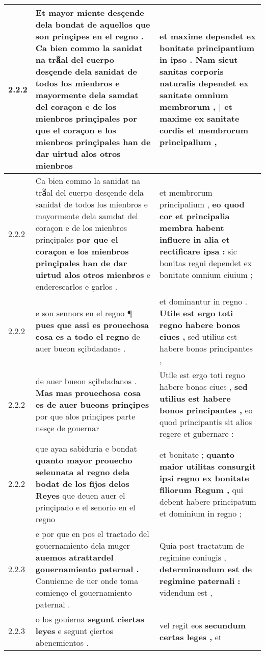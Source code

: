 \begin{tabular}{|p{1cm}|p{6.5cm}|p{6.5cm}|}
2.2.2 & Et mayor miente desçende dela bondat de aquellos que son prinçipes en el regno . \textbf{ Ca bien commo la sanidat na tra᷑al del cuerpo desçende dela sanidat de todos los mienbros e mayormente dela samdat del coraçon e de los mienbros prinçipales } por que el coraçon e los mienbros prinçipales han de dar uirtud alos otros mienbros & et maxime dependet ex bonitate principantium in ipso . \textbf{ Nam sicut sanitas corporis naturalis dependet ex sanitate omnium membrorum , | et maxime ex sanitate cordis } et membrorum principalium , \\\hline
2.2.2 & Ca bien commo la sanidat na tra᷑al del cuerpo desçende dela sanidat de todos los mienbros e mayormente dela samdat del coraçon e de los mienbros prinçipales \textbf{ por que el coraçon e los mienbros prinçipales han de dar uirtud alos otros mienbros } e enderescarlos e garlos . & et membrorum principalium , \textbf{ eo quod cor et principalia membra habent influere in alia et rectificare ipsa : } sic bonitas regni dependet ex bonitate omnium ciuium ; \\\hline
2.2.2 & e son sennors en el regno ¶ \textbf{ pues que assi es prouechosa cosa es a todo el regno } de auer bueon sçibdadanos . & et dominantur in regno . \textbf{ Utile est ergo toti regno habere bonos ciues , } sed utilius est habere bonos principantes , \\\hline
2.2.2 & de auer bueon sçibdadanos . \textbf{ Mas mas prouechosa cosa es de auer bueons prinçipes } por que alos prinçipes parte nesçe de gouernar & Utile est ergo toti regno habere bonos ciues , \textbf{ sed utilius est habere bonos principantes , } eo quod principantis sit alios regere et gubernare : \\\hline
2.2.2 & que ayan sabiduria e bondat \textbf{ quanto mayor prouecho seleunata al regno dela bodat de los fijos delos Reyes } que deuen auer el prinçipado e el senorio en el regno & et bonitate ; \textbf{ quanto maior utilitas consurgit ipsi regno ex bonitate filiorum Regum , } qui debent habere principatum et dominium in regno ; \\\hline
2.2.3 & e por que en pos el tractado del gouernamiento dela muger \textbf{ auemos atrattardel gouernamiento paternal . } Conuienne de uer onde toma comienço el gouernamiento paternal . & Quia post tractatum de regimine coniugis , \textbf{ determinandum est de regimine paternali : } videndum est , \\\hline
2.2.3 & o los gouierna \textbf{ segunt ciertas leyes } e segunt çiertos abenemientos . & vel regit eos \textbf{ secundum certas leges , } et \\\hline

\end{tabular}
